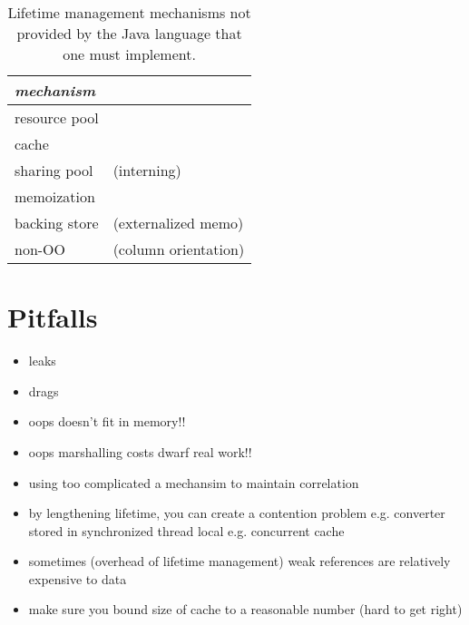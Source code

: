 \begin{table}
\centering
\begin{tabular}{|l|l|} \hline
\em mechanism & \\ \hline \hline
resource pool & \\ \hline
cache & \\ \hline
sharing pool & (interning)\\ \hline
memoization & \\ \hline
backing store &(externalized memo) \\ \hline
non-OO & (column orientation) \\ \hline 
\end{tabular}
\caption{Lifetime management mechanisms not provided by the Java language that one must implement.}
\label{tab:software-lifetime-management}
\end{table}


\section{Pitfalls}

\begin{itemize}
\item leaks
\item drags
\item oops doesn't fit in memory!!
\item oops marshalling costs dwarf real work!!
\item using too complicated a mechansim to maintain correlation
\item by lengthening lifetime, you can create a contention problem
	e.g. converter stored in synchronized thread local
	e.g. concurrent cache
\item sometimes (overhead of lifetime management) weak references are relatively expensive to data
\item make sure you bound size of cache to a reasonable number (hard to get right)
\end{itemize}


